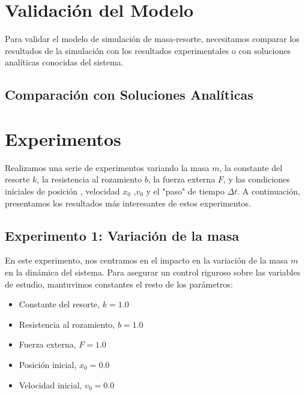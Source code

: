 \documentclass[]{article}
\begin{document}
\section{Validación del Modelo}
Para validar el modelo de simulación de masa-resorte, necesitamos comparar los resultados de la simulación con los resultados experimentales o con soluciones analíticas conocidas del sistema.

\subsection{Comparación con Soluciones Analíticas}


\section{Experimentos}
Realizamos una serie de experimentos variando la masa $m$, la constante del resorte $k$, la resistencia al rozamiento $b$, la fuerza externa $F$, y las condiciones iniciales de posición  , velocidad $x_0$ ,$v_0$ y el "paso" de tiempo $\Delta t$. A continuación, presentamos los resultados más interesantes de estos experimentos.

\subsection{Experimento 1: Variación de la masa}
En este experimento, nos centramos en el impacto en  la variación de la masa $m$ en la dinámica del sistema. Para asegurar un control riguroso sobre las variables de estudio, mantuvimos constantes el resto de los parámetros:

\begin{itemize}
\item Constante del resorte, $k = 1.0$
\item Resistencia al rozamiento, $b = 1.0$
\item Fuerza externa, $F = 1.0$
\item Posición inicial, $x_0 = 0.0$
\item Velocidad inicial, $v_0 = 0.0$
\end{itemize}
\end{document}
